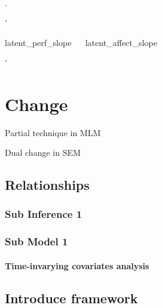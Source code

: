 \documentclass[english,,man]{apa6}
\newenvironment{Shaded}{\begin{snugshade}}{\end{snugshade}}
\newcommand{\StringTok}[1]{\textcolor[rgb]{0.31,0.60,0.02}{#1}}
\let\oldparagraph\paragraph
\renewcommand{\paragraph}[1]{\oldparagraph{#1}\mbox{}}
\theoremstyle{definition}
\theoremstyle{definition}
\theoremstyle{definition}
\theoremstyle{remark}
\begin{document}
.

\begin{Shaded}
\begin{Highlighting}[]
\StringTok{'}

\StringTok{latent_perf_slope ~~ latent_affect_slope}

\StringTok{'}
\end{Highlighting}
\end{Shaded}

\hypertarget{change}{%
\section{Change}\label{change}}

Partial technique in MLM

Dual change in SEM

\hypertarget{relationships-1}{%
\subsection{Relationships}\label{relationships-1}}

\hypertarget{sub-inference-1}{%
\subsubsection{Sub Inference 1}\label{sub-inference-1}}

\hypertarget{section}{%
\paragraph{}\label{section}}

\hypertarget{sub-model-1}{%
\subsubsection{Sub Model 1}\label{sub-model-1}}

\hypertarget{time-invarying-covariates-analysis}{%
\paragraph{Time-invarying covariates
analysis}\label{time-invarying-covariates-analysis}}

\hypertarget{introduce-framework}{%
\subsection{Introduce framework}\label{introduce-framework}}
\end{document}

